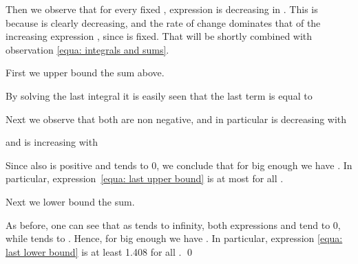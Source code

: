 \documentclass[11pt]{llncs}
\begin{document}
Then we observe that for every fixed , expression  is decreasing in . This is because  is clearly decreasing, and the rate of change dominates that of the increasing expression , since  is fixed. That will be shortly combined with observation \eqref{equa: integrals and sums}. 

First we upper bound the sum above. 

By solving the last integral it is easily seen that the
last term is equal to



Next we observe that both  are non negative, and in particular  is decreasing with 

and  is increasing with 

Since also  is positive and tends to 0, we conclude that for big enough  we have . In particular, expression~\eqref{equa: last upper bound} is at most  for all .

Next we lower bound the sum. 

As before, one can see that as  tends to infinity, both expressions  and  tend to 0, while  tends to . Hence, for big enough  we have 
. In particular, expression \eqref{equa: last lower bound} is at least 1.408 for all . 
\qed
\end{document}
